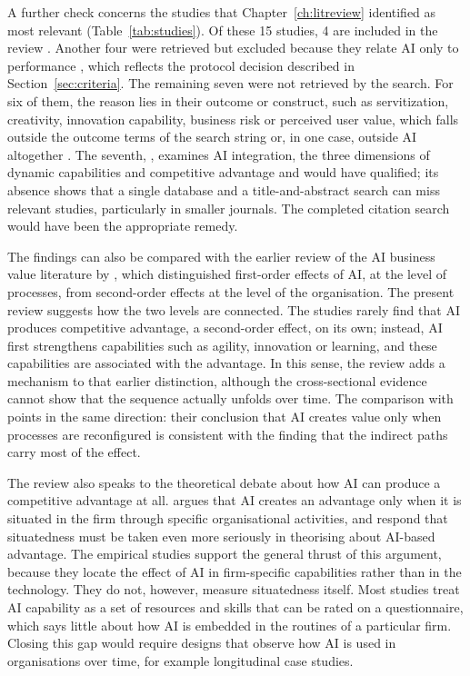 A further check concerns the studies that Chapter~\ref{ch:litreview} identified as most relevant (Table~\ref{tab:studies}). Of these 15 studies, 4 are included in the review \parencite{shao2026, almheiri2024, almheiri2025, aldhaheri2024}. Another four were retrieved but excluded because they relate AI only to performance \parencite{chen2022, mikalef2023, mikalef2023public, neiroukh2025}, which reflects the protocol decision described in Section~\ref{sec:criteria}. The remaining seven were not retrieved by the search. For six of them, the reason lies in their outcome or construct, such as servitization, creativity, innovation capability, business risk or perceived user value, which falls outside the outcome terms of the search string \parencite{aboufoul2023, ameen2024, gao2025, drydakis2022, yu2026} or, in one case, outside AI altogether \parencite{mikalef2020}. The seventh, \textcite{selgascors2026}, examines AI integration, the three dimensions of dynamic capabilities and competitive advantage and would have qualified; its absence shows that a single database and a title-and-abstract search can miss relevant studies, particularly in smaller journals. The completed citation search would have been the appropriate remedy.

The findings can also be compared with the earlier review of the AI business value literature by \textcite{enholm2022}, which distinguished first-order effects of AI, at the level of processes, from second-order effects at the level of the organisation. The present review suggests how the two levels are connected. The studies rarely find that AI produces competitive advantage, a second-order effect, on its own; instead, AI first strengthens capabilities such as agility, innovation or learning, and these capabilities are associated with the advantage. In this sense, the review adds a mechanism to that earlier distinction, although the cross-sectional evidence cannot show that the sequence actually unfolds over time. The comparison with \textcite{wambataguimdje2020} points in the same direction: their conclusion that AI creates value only when processes are reconfigured is consistent with the finding that the indirect paths carry most of the effect.

The review also speaks to the theoretical debate about how AI can produce a competitive advantage at all. \textcite{kemp2024} argues that AI creates an advantage only when it is situated in the firm through specific organisational activities, and \textcite{moser2024} respond that situatedness must be taken even more seriously in theorising about AI-based advantage. The empirical studies support the general thrust of this argument, because they locate the effect of AI in firm-specific capabilities rather than in the technology. They do not, however, measure situatedness itself. Most studies treat AI capability as a set of resources and skills that can be rated on a questionnaire, which says little about how AI is embedded in the routines of a particular firm. Closing this gap would require designs that observe how AI is used in organisations over time, for example longitudinal case studies.

